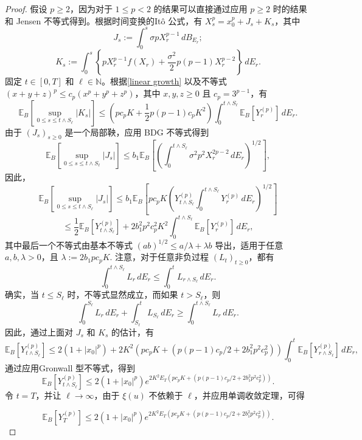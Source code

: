 \begin{proof}
	假设 $p \geq 2$，因为对于 $1 \leq p < 2$ 的结果可以直接通过应用 $p \geq 2$ 时的结果和 Jensen 不等式得到。根据时间变换的Itô 公式，有 $X_s^p = x_0^p + J_s + K_s$，其中
	\[
	J_s := \int_0^s \sigma p X_r^{p-1}  \, dB_{E_r};
	\]
	\[
	K_s := \int_0^s \left\{ p X_r^{p-1} f(X_r) + \frac{\sigma^2}{2} p (p-1) X_r^{p-2}  \right\} \, dE_r.
	\]
	固定 $t \in [0, T]$ 和 $\ell \in \mathbb{N}$。根据\cref{linear growth} 以及不等式 $(x + y + z)^p \leq c_p (x^p + y^p + z^p)$，其中 $x, y, z \geq 0$ 且 $c_p = 3^{p-1}$，有
	\[
	\mathbb{E}_B\left[ \sup_{0 \leq s \leq t \wedge S_{\ell}} |K_s| \right] \leq \left( p c_p K + \frac{1}{2} p(p-1) c_p K^2 \right) \int_0^{t \wedge S_{\ell}} \mathbb{E}_B[Y_r^{(p)}] \, dE_r.
	\]
	由于 $(J_s)_{s \geq 0}$ 是一个局部鞅，应用 BDG 不等式得到
	\[
	\mathbb{E}_B\left[\sup_{0 \leq s \leq t \wedge S_{\ell}} |J_s| \right] \leq b_1 \mathbb{E}_B \left[\left( \int_0^{t \wedge S_{\ell}} \sigma^2 p^2 X_r^{2p-2}  \, dE_r \right)^{1/2}\right],
	\]
	因此，
	\[
	\mathbb{E}_B \left[\sup_{0 \leq s \leq t \wedge S_{\ell}} |J_s| \right] \leq b_1 \mathbb{E}_B \left[ p c_p K \left( Y_{t \wedge S_{\ell}}^{(p)} \int_0^{t \wedge S_{\ell}} Y_r^{(p)} \, dE_r \right)^{1/2} \right]
	\]
	\[
	\leq \frac{1}{2} \mathbb{E}_B \left[Y_{t \wedge S_{\ell}}^{(p)}\right] + 2b_1^2 p^2 c_p^2 K^2 \int_0^{t \wedge S_{\ell}} \mathbb{E}_B \left[Y_r^{(p)}\right] \, dE_r,
	\]
	其中最后一个不等式由基本不等式 $(ab)^{1/2} \leq a/\lambda + \lambda b$ 导出，适用于任意 $a, b, \lambda > 0$，且 $\lambda := 2b_1 p c_p K$. 
	注意，对于任意非负过程 $(L_t)_{t \geq 0}$，都有
	\[
	\int_0^{t \wedge S_{\ell}} L_r \, dE_r \leq \int_0^t L_{r \wedge S_{\ell}} \, dE_r.
	\]
	确实，当 $t \leq S_{\ell}$ 时，不等式显然成立，而如果 $t > S_{\ell}$，则
	\[
	\int_0^{S_{\ell}} L_r \, dE_r + \int_{S_{\ell}}^t L_{S_{\ell}} \, dE_r \geq \int_0^{t \wedge S_{\ell}} L_r \, dE_r.
	\]
	因此，通过上面对 $J_s$ 和 $K_s$ 的估计，有
	\[
	\mathbb{E}_B[Y_{t \wedge S_{\ell}}^{(p)}] \leq 2(1 + |x_0|^p) + 2K^2\left(p c_p K + \left(p(p-1) c_p / 2 + 2b_1^2 p^2 c_p^2\right) \right)\int_0^t \mathbb{E}_B[Y_{r \wedge S_{\ell}}^{(p)}] \, dE_r,
	\]
	通过应用Gronwall 型不等式，得到
	\[
	\mathbb{E}_B[Y_{t \wedge S_{\ell}}^{(p)}] \leq 2(1 + |x_0|^p) e^{2K^2E_T\left(p c_p K + \left(p(p-1) c_p / 2 + 2b_1^2 p^2 c_p^2\right) \right) }.
	\]
	令 $t = T$，并让 $\ell \to \infty$，由于 $\xi(u)$ 不依赖于 $\ell$，并应用单调收敛定理，可得
	
	\begin{equation}\label{boundY}
			\mathbb{E}_B[Y_T^{(p)}] \leq 2(1 + |x_0|^p) e^{2K^2E_T \left(p c_p K + \left(p(p-1) c_p / 2 + 2b_1^2 p^2 c_p^2\right) \right)}. 
	\end{equation}
	
\end{proof}

